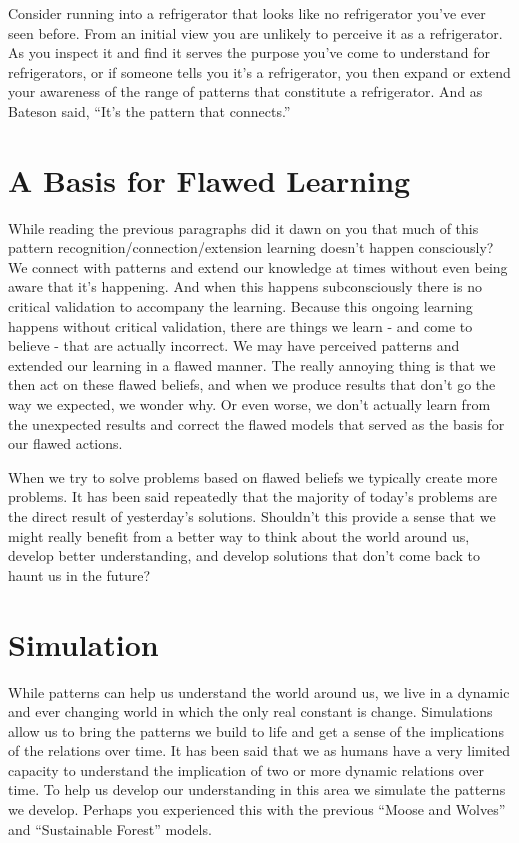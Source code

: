 \documentclass[]{memoir}
\begin{document}
Consider running into a refrigerator that looks like no refrigerator
you've ever seen before. From an initial view you are unlikely to
perceive it as a refrigerator. As you inspect it and find it serves the
purpose you've come to understand for refrigerators, or if someone tells
you it's a refrigerator, you then expand or extend your awareness of the
range of patterns that constitute a refrigerator. And as Bateson said,
``It's the pattern that connects.''

\section{A Basis for Flawed Learning}

While reading the previous paragraphs did it dawn on you that much of
this pattern recognition/connection/extension learning doesn't happen
consciously? We connect with patterns and extend our knowledge at times
without even being aware that it's happening. And when this happens
subconsciously there is no critical validation to accompany the
learning. Because this ongoing learning happens without critical
validation, there are things we learn - and come to believe - that are
actually incorrect. We may have perceived patterns and extended our
learning in a flawed manner. The really annoying thing is that we then
act on these flawed beliefs, and when we produce results that don't go
the way we expected, we wonder why. Or even worse, we don't actually
learn from the unexpected results and correct the flawed models that
served as the basis for our flawed actions.

When we try to solve problems based on flawed beliefs we typically
create more problems. It has been said repeatedly that the majority of
today's problems are the direct result of yesterday's solutions.
Shouldn't this provide a sense that we might really benefit from a
better way to think about the world around us, develop better
understanding, and develop solutions that don't come back to haunt us in
the future?

\section{Simulation}

While patterns can help us understand the world around us, we live in a
dynamic and ever changing world in which the only real constant is
change. Simulations allow us to bring the patterns we build to life and
get a sense of the implications of the relations over time. It has been
said that we as humans have a very limited capacity to understand the
implication of two or more dynamic relations over time. To help us
develop our understanding in this area we simulate the patterns we
develop. Perhaps you experienced this with the previous ``Moose and
Wolves'' and ``Sustainable Forest'' models.
\end{document}
